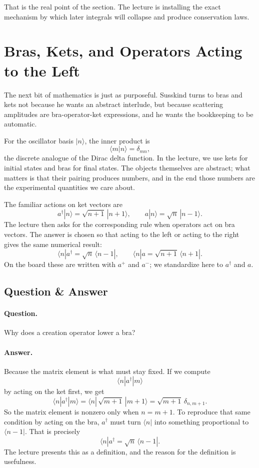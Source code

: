 That is the real point of the section. The lecture is installing the exact mechanism by which later integrals will collapse and produce conservation laws.

\section{Bras, Kets, and Operators Acting to the Left}

The next bit of mathematics is just as purposeful. Susskind turns to bras and kets not because he wants an abstract interlude, but because scattering amplitudes are bra-operator-ket expressions, and he wants the bookkeeping to be automatic.

For the oscillator basis \(|n\rangle\), the inner product is
\begin{equation}
\langle m|n\rangle=\delta_{mn},
\end{equation}
the discrete analogue of the Dirac delta function. In the lecture, we use kets for initial states and bras for final states. The objects themselves are abstract; what matters is that their pairing produces numbers, and in the end those numbers are the experimental quantities we care about.

The familiar actions on ket vectors are
\begin{equation}
a^\dagger|n\rangle=\sqrt{n+1}\,|n+1\rangle,
\qquad
a|n\rangle=\sqrt{n}\,|n-1\rangle.
\end{equation}
The lecture then asks for the corresponding rule when operators act on bra vectors. The answer is chosen so that acting to the left or acting to the right gives the same numerical result:
\begin{equation}
\langle n|a^\dagger=\sqrt{n}\,\langle n-1|,
\qquad
\langle n|a=\sqrt{n+1}\,\langle n+1|.
\end{equation}
On the board these are written with \(a^+\) and \(a^-\); we standardize here to \(a^\dagger\) and \(a\).

\subsection{Question \& Answer}

\paragraph{Question.} Why does a creation operator lower a bra?

\paragraph{Answer.} Because the matrix element is what must stay fixed. If we compute
\[
\langle n|a^\dagger|m\rangle
\]
by acting on the ket first, we get
\[
\langle n|a^\dagger|m\rangle
=
\langle n|\,\sqrt{m+1}\,|m+1\rangle
=
\sqrt{m+1}\,\delta_{n,m+1}.
\]
So the matrix element is nonzero only when \(n=m+1\). To reproduce that same condition by acting on the bra, \(a^\dagger\) must turn \(\langle n|\) into something proportional to \(\langle n-1|\). That is precisely
\[
\langle n|a^\dagger=\sqrt{n}\,\langle n-1|.
\]
The lecture presents this as a definition, and the reason for the definition is usefulness.

